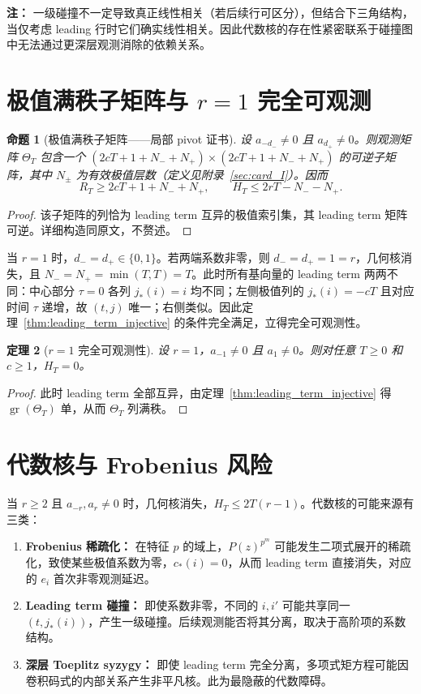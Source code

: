 \documentclass[11pt,a4paper]{ctexart}
\newtheorem{theorem}{定理}[section]
\newtheorem{proposition}[theorem]{命题}
\DeclareMathOperator{\gr}{gr}
\begin{document}
\textbf{注：} 一级碰撞不一定导致真正线性相关（若后续行可区分），但结合下三角结构，当仅考虑 leading 行时它们确实线性相关。因此代数核的存在性紧密联系于碰撞图中无法通过更深层观测消除的依赖关系。

\section{极值满秩子矩阵与 \(r=1\) 完全可观测}
\begin{proposition}[极值满秩子矩阵——局部 pivot 证书]\label{prop:extreme_submatrix}
设 \(a_{-d_-}\neq0\) 且 \(a_{d_+}\neq0\)。则观测矩阵 \(\Theta_T\) 包含一个 \((2cT+1 + N_- + N_+)\times(2cT+1 + N_- + N_+)\) 的可逆子矩阵，其中 \(N_\pm\) 为有效极值层数（定义见附录~\ref{sec:card_I}）。因而
\[
R_T \ge 2cT+1 + N_- + N_+,\qquad
H_T \le 2rT - N_- - N_+.
\]
\end{proposition}
\begin{proof}
该子矩阵的列恰为 leading term 互异的极值索引集，其 leading term 矩阵可逆。详细构造同原文，不赘述。
\end{proof}

当 \(r=1\) 时，\(d_-=d_+\in\{0,1\}\)。若两端系数非零，则 \(d_-=d_+=1=r\)，几何核消失，且 \(N_-=N_+=\min(T,T)=T\)。此时所有基向量的 leading term 两两不同：中心部分 \(\tau=0\) 各列 \(j_*(i)=i\) 均不同；左侧极值列的 \(j_*(i)=-cT\) 且对应时间 \(\tau\) 递增，故 \((t,j)\) 唯一；右侧类似。因此定理~\ref{thm:leading_term_injective} 的条件完全满足，立得完全可观测性。

\begin{theorem}[\(r=1\) 完全可观测性]\label{thm:r1_full_obs}
设 \(r=1\)，\(a_{-1}\neq0\) 且 \(a_1\neq0\)。则对任意 \(T\ge0\) 和 \(c\ge1\)，\(H_T=0\)。
\end{theorem}
\begin{proof}
此时 leading term 全部互异，由定理~\ref{thm:leading_term_injective} 得 \(\gr(\Theta_T)\) 单，从而 \(\Theta_T\) 列满秩。
\end{proof}

\section{代数核与 Frobenius 风险}
当 \(r\ge2\) 且 \(a_{-r},a_r\neq0\) 时，几何核消失，\(H_T\le 2T(r-1)\)。代数核的可能来源有三类：
\begin{enumerate}[label=(\arabic*)]
    \item \textbf{Frobenius 稀疏化：} 在特征 \(p\) 的域上，\(P(z)^{p^m}\) 可能发生二项式展开的稀疏化，致使某些极值系数为零，\(c_*(i)=0\)，从而 leading term 直接消失，对应的 \(e_i\) 首次非零观测延迟。
    \item \textbf{Leading term 碰撞：} 即使系数非零，不同的 \(i,i'\) 可能共享同一 \((t,j_*(i))\)，产生一级碰撞。后续观测能否将其分离，取决于高阶项的系数结构。
    \item \textbf{深层 Toeplitz syzygy：} 即使 leading term 完全分离，多项式矩方程可能因卷积码式的内部关系产生非平凡核。此为最隐蔽的代数障碍。
\end{enumerate}
\end{document}
